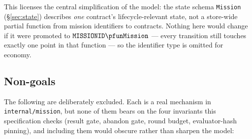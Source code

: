 \documentclass[a4paper,10pt,fleqn]{article}
\newcommand{\fpath}[1]{\nolinkurl{#1}}
\newcommand{\field}[1]{\ifmmode\texttt{#1}\else\texorpdfstring{\breakfield{#1}}{#1}\fi}
\begin{document}
This licenses the central simplification of the model: the state
schema \field{Mission} (\S\ref{sec:state}) describes \emph{one}
contract's lifecycle-relevant state, not a store-wide partial
function from mission identifiers to contracts. Nothing here would
change if it were promoted to $\field{MISSIONID} \pfun \field{Mission}$
--- every transition still touches exactly one point in that
function --- so the identifier type is omitted for economy.

\subsection{Non-goals}
\label{sec:nongoals}

The following are deliberately excluded. Each is a real mechanism in
\fpath{internal/mission}, but none of them bears on the four
invariants this specification checks (result gate, abandon gate,
round budget, evaluator-hash pinning), and including them would
obscure rather than sharpen the model:
\end{document}
